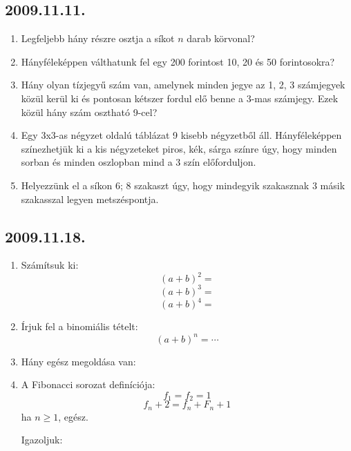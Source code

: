 \subsection*{2009.11.11.}
\begin{enumerate}
\item Legfeljebb hány részre osztja a síkot $n$ darab körvonal?
\item Hányféleképpen válthatunk fel egy 200 forintost 10, 20 és 50 forintosokra?
\item Hány olyan tízjegyű szám van, amelynek minden jegye az 1, 2, 3 számjegyek közül kerül ki és pontosan kétszer fordul elő benne a 3-mas számjegy. Ezek közül hány szám osztható 9-cel?
\item Egy 3x3-as négyzet oldalú táblázat 9 kisebb négyzetből áll. Hányféleképpen színezhetjük ki a kis négyzeteket piros, kék, sárga színre úgy, hogy minden sorban és minden oszlopban mind a 3 szín előforduljon.
\item Helyezzünk el a síkon 6; 8 szakaszt úgy, hogy mindegyik szakasznak 3 másik szakasszal legyen metszéspontja.
\end{enumerate}

\subsection*{2009.11.18.}
\begin{enumerate}
\item Számítsuk ki: $$(a+b)^2=$$ $$(a+b)^3=$$ $$(a+b)^4=$$
\item Írjuk fel a binomiális tételt: $$(a+b)^n=\cdots$$
\item Hány egész megoldása van: 
\item A Fibonacci sorozat definíciója: $$f_1=f_2=1$$ $$f_n+2=f_n+F_n+1$$ ha $n\geq 1$, egész.

Igazoljuk:
\end{enumerate}

